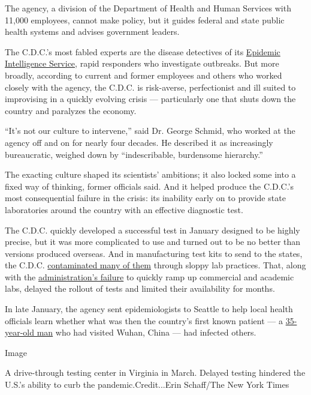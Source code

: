 The agency, a division of the Department of Health and Human Services
with 11,000 employees, cannot make policy, but it guides federal and
state public health systems and advises government leaders.

The C.D.C.'s most fabled experts are the disease detectives of its
\href{https://www.cdc.gov/eis/index.html}{Epidemic Intelligence
Service}, rapid responders who investigate outbreaks. But more broadly,
according to current and former employees and others who worked closely
with the agency, the C.D.C. is risk-averse, perfectionist and ill suited
to improvising in a quickly evolving crisis --- particularly one that
shuts down the country and paralyzes the economy.

``It's not our culture to intervene,'' said Dr. George Schmid, who
worked at the agency off and on for nearly four decades. He described it
as increasingly bureaucratic, weighed down by ``indescribable,
burdensome hierarchy.''

The exacting culture shaped its scientists' ambitions; it also locked
some into a fixed way of thinking, former officials said. And it helped
produce the C.D.C.'s most consequential failure in the crisis: its
inability early on to provide state laboratories around the country with
an effective diagnostic test.

The C.D.C. quickly developed a successful test in January designed to be
highly precise, but it was more complicated to use and turned out to be
no better than versions produced overseas. And in manufacturing test
kits to send to the states, the C.D.C.
\href{https://www.nytimes3xbfgragh.onion/2020/04/18/health/cdc-coronavirus-lab-contamination-testing.html}{contaminated
many of them} through sloppy lab practices. That, along with the
\href{https://www.nytimes3xbfgragh.onion/2020/07/18/us/politics/trump-coronavirus-response-failure-leadership.html}{administration's
failure} to quickly ramp up commercial and academic labs, delayed the
rollout of tests and limited their availability for months.

In late January, the agency sent epidemiologists to Seattle to help
local health officials learn whether what was then the country's first
known patient --- a
\href{https://www.nejm.org/doi/full/10.1056/NEJMoa2001191}{35-year-old
man} who had visited Wuhan, China --- had infected others.

Image

A drive-through testing center in Virginia in March. Delayed testing
hindered the U.S.'s ability to curb the pandemic.Credit...Erin
Schaff/The New York Times

